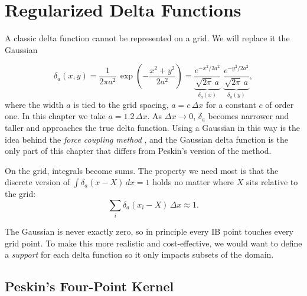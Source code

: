 \section{Regularized Delta Functions}
\label{sec:IBdelta}

A classic delta function cannot be represented on a grid. We will replace it
the Gaussian

\begin{equation}
  \delta_a(x, y) = \frac{1}{2\pi a^2}\,
  \exp\!\left(-\frac{x^2 + y^2}{2a^2}\right)
  = \underbrace{\frac{e^{-x^2/2a^2}}{\sqrt{2\pi}\,a}}_{\delta_a(x)}\;
    \underbrace{\frac{e^{-y^2/2a^2}}{\sqrt{2\pi}\,a}}_{\delta_a(y)},
  \label{eq:IBgauss}
\end{equation}
where the width $a$ is tied to the grid spacing, $a = c\,\Delta x$ for a
constant $c$ of order one. In this chapter we take $a = 1.2\,\Delta x$. As
$\Delta x \to 0$, $\delta_a$ becomes narrower and taller and approaches the
true delta function. Using a Gaussian in this way is the idea behind the
\emph{force coupling method} \parencite{maxeyPatel2001}, and the Gaussian delta function
is the only part of this chapter that differs from Peskin's version of the
method.

On the grid, integrals become sums. The property we need most is that the
discrete version of $\int \delta_a(x - X)\,dx = 1$ holds no matter where
$X$ sits relative to the grid:
\begin{equation}
  \sum_i \delta_a(x_i - X)\,\Delta x \approx 1 .
  \label{eq:IBunity}
\end{equation}

\begin{remark}
The Gaussian is never exactly zero, so in principle every IB point
touches every grid point. To make this more realistic and cost-effective, we would want to define a \textit{support} for each delta function so it only impacts subsets of the domain.
\end{remark}

\subsection{Peskin's Four-Point Kernel}

